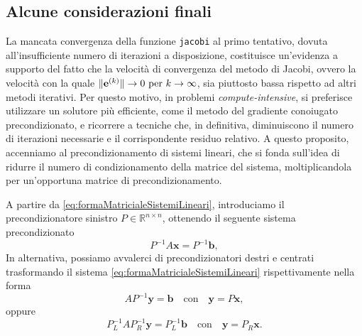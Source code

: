 \subsection{Alcune considerazioni finali}
La mancata convergenza della funzione \lstinline{jacobi} al primo tentativo, dovuta all'insufficiente numero di iterazioni a disposizione, costituisce un'evidenza a supporto del fatto che la velocit\`a di convergenza del metodo di Jacobi, ovvero la velocit\`a con la quale $\lVert\mathbf{e}^{(k)}\rVert  \rightarrow 0 \text{ per } k\rightarrow{\infty}$, sia piuttosto bassa rispetto ad altri metodi iterativi.\newline
Per questo motivo, in problemi \textit{compute-intensive}, si preferisce utilizzare un solutore pi\`u efficiente, come il metodo del gradiente conoiugato precondizionato, e ricorrere a tecniche che, in definitiva, diminuiscono il numero di iterazioni necessarie e il corrispondente residuo relativo. \newline
A questo proposito, accenniamo al precondizionamento di sistemi lineari, che si fonda sull'idea di ridurre il numero di condizionamento della matrice del sistema, moltiplicandola per un'opportuna matrice di precondizionamento.

A partire da \eqref{eq:formaMatricialeSistemiLineari}, introduciamo il precondizionatore sinistro $P\in\mathbb{R}^{n\times n}$, ottenendo il seguente sistema precondizionato
\begin{equation}
    P^{-1}A\mathbf{x} = P^{-1}\mathbf{b},
\end{equation}
In alternativa, possiamo avvalerci di precondizionatori destri e centrati trasformando il sistema \eqref{eq:formaMatricialeSistemiLineari} rispettivamente nella forma
\begin{equation*}
    AP^{-1}\mathbf{y} = \mathbf{b} \quad \text{con}\quad \mathbf{y} = P\mathbf{x},
\end{equation*}
oppure
\begin{equation*}
   P_{L}^{-1}AP_{R}^{-1}\mathbf{y}=P_{L}^{-1}\mathbf{b} \quad \text{con} \quad \mathbf{y} = P_{R}\mathbf{x}.
\end{equation*}
